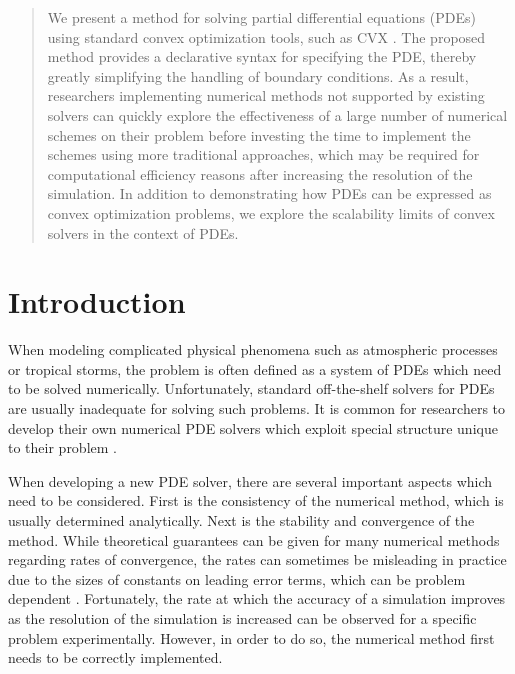 \documentclass[conference]{IEEEtran}
\begin{document}
\begin{abstract}
  We present a method for solving partial differential equations (PDEs) using standard convex optimization tools, such as CVX \cite{cvx,gb08}. The proposed method provides a declarative syntax for specifying the PDE, thereby greatly simplifying the handling of boundary conditions. As a result, researchers implementing numerical methods not supported by existing solvers can quickly explore the effectiveness of a large number of numerical schemes on their problem before investing the time to implement the schemes using more traditional approaches, which may be required for computational efficiency reasons after increasing the resolution of the simulation. In addition to demonstrating how PDEs can be expressed as convex optimization problems, we explore the scalability limits of convex solvers in the context of PDEs.
\end{abstract}


\section{Introduction}

When modeling complicated physical phenomena such as atmospheric processes or tropical storms, the problem is often defined as a system of PDEs which need to be solved numerically. Unfortunately, standard off-the-shelf solvers for PDEs are usually inadequate for solving such problems. It is common for researchers to develop their own numerical PDE solvers which exploit special structure unique to their problem \cite{berger1984amr,berger2011geoclaw,mandli2014ss,mandli2016clawpack}.

When developing a new PDE solver, there are several important aspects which need to be considered. First is the consistency of the numerical method, which is usually determined analytically. Next is the stability and convergence of the method. While theoretical guarantees can be given for many numerical methods regarding rates of convergence, the rates can sometimes be misleading in practice due to the sizes of constants on leading error terms, which can be problem dependent \cite{ch15fdad}. Fortunately, the rate at which the accuracy of a simulation improves as the resolution of the simulation is increased can be observed for a specific problem experimentally. However, in order to do so, the numerical method first needs to be correctly implemented.
\end{document}
